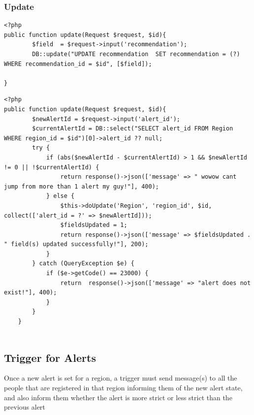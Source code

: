 \documentclass{article}
\begin{document}
\subsubsection{Update}
\begin{verbatim}
<?php
public function update(Request $request, $id){
        $field  = $request->input('recommendation');
        DB::update("UPDATE recommendation  SET recommendation = (?) WHERE recommendation_id = $id", [$field]);

}
\end{verbatim}
\begin{verbatim}
<?php
public function update(Request $request, $id){
        $newAlertId = $request->input('alert_id');
        $currentAlertId = DB::select("SELECT alert_id FROM Region WHERE region_id = $id")[0]->alert_id ?? null;
        try {
            if (abs($newAlertId - $currentAlertId) > 1 && $newAlertId != 0 || !$currentAlertId) {
                return response()->json(['message' => " wowow cant jump from more than 1 alert my guy!"], 400);
            } else {
                $this->doUpdate('Region', 'region_id', $id, collect(['alert_id = ?' => $newAlertId]));
                $fieldsUpdated = 1;
                return response()->json(['message' => $fieldsUpdated . " field(s) updated successfully!"], 200);
            }
        } catch (QueryException $e) {
            if ($e->getCode() == 23000) {
                return  response()->json(['message' => "alert does not exist!"], 400);
            }
        }
    }
    
\end{verbatim}

\subsection{Trigger for Alerts}
Once a new alert is set for a region, a trigger must send message(s) to all the people that
are registered in that region informing them of the new alert state, and also inform them
whether the alert is more strict or less strict than the previous alert
\end{document}
